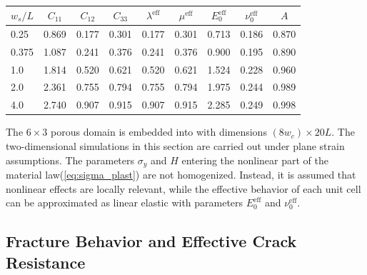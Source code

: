 \documentclass[pdflatex,sn-mathphys-num]{sn-jnl}%
\theoremstyle{thmstyleone}%
\theoremstyle{thmstyletwo}%
\theoremstyle{thmstylethree}%
\begin{document}
\begin{table}[htb]
\centering
\caption{}
\label{tab:effective_stiffness_2D}
\begin{tabular}{lcccccccc}
\toprule
$w_s/L$ & $C_{11}$ & $C_{12}$ & $C_{33}$ & $\lambda^{\text{eff}}$ & $\mu^{\text{eff}}$ & $E_0^{\text{eff}}$ & $\nu_0^{\text{eff}}$ & $A$ \\
\midrule
0.25  & 0.869 & 0.177 & 0.301 & 0.177 & 0.301 & 0.713 & 0.186 & 0.870 \\
0.375 & 1.087 & 0.241 & 0.376 & 0.241 & 0.376 & 0.900 & 0.195 & 0.890 \\
1.0   & 1.814 & 0.520 & 0.621 & 0.520 & 0.621 & 1.524 & 0.228 & 0.960 \\
2.0   & 2.361 & 0.755 & 0.794 & 0.755 & 0.794 & 1.975 & 0.244 & 0.989 \\
4.0   & 2.740 & 0.907 & 0.915 & 0.907 & 0.915 & 2.285 & 0.249 & 0.998 \\
\bottomrule
\end{tabular}
\end{table}

The $6 \times 3$ porous domain is embedded into  with dimensions $(8 w_c) \times 20 L$. The two-dimensional simulations in this section are carried out under plane strain assumptions. The parameters $\sigma_y$ and $H$ entering the nonlinear part of the material law(\ref{eq:sigma_plast})\added{,} are not homogenized.
Instead, it is assumed that nonlinear effects are locally relevant, while the effective behavior of each unit cell can be approximated as linear elastic with parameters $E_0^{\text{eff}}$ and $\nu_0^{\text{eff}}$. 

\subsection{Fracture Behavior and Effective Crack Resistance}
\label{sec:2D_fracture_behavior}
\end{document}

